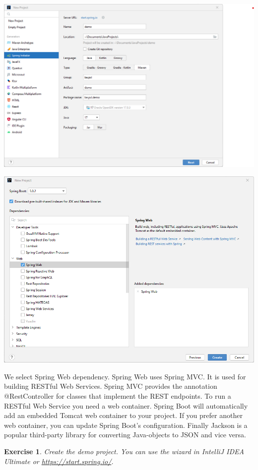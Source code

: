 \documentclass[a4paper, 12pt]{report}
\newenvironment{boxexercise}
{\begin{tcolorbox}
[enhanced jigsaw,breakable,pad at break*=1mm,
 colback=tsyellow!20,boxrule=0pt,frame hidden]}
{\end{tcolorbox}}
\newtheorem{envoefening}{\textbf{Exercise}}[chapter]
\newenvironment{oefening}
               {\begin{boxexercise}\begin{envoefening}}
               {\end{envoefening}\end{boxexercise}}
\begin{document}
\includegraphics[width=\textwidth]{./images/chapter1/spring_initializer_intellij.png}

\includegraphics[width=\textwidth]{./images/chapter1/new_project.png}

We select Spring Web dependency. Spring Web uses Spring MVC. It is used for building RESTful Web Services. Spring MVC provides the annotation @RestController for classes that implement the REST endpoints.
To run a RESTful Web Service you need a web container. Spring Boot will automatically add an embedded Tomcat web container to your project. If you prefer another web container, you can update Spring Boot's configuration.
Finally Jackson is a popular third-party library for converting Java-objects to JSON and vice versa.

\begin{oefening}
Create the demo project. You can use the wizard in IntelliJ IDEA Ultimate or \url{https://start.spring.io/}.
\end{oefening}
\end{document}
